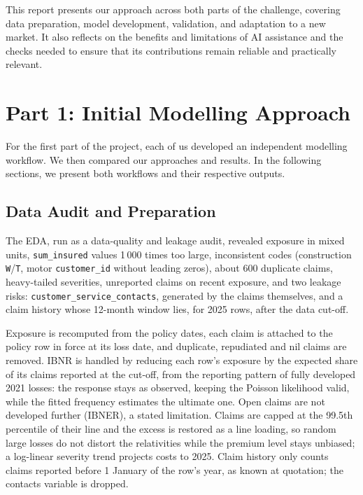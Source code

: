 \documentclass{rapport}
\begin{document}
This report presents our approach across both parts of the challenge, covering data preparation, model development, validation, and adaptation to a new market. It also reflects on the benefits and limitations of AI assistance and the checks needed to ensure that its contributions remain reliable and practically relevant.

\section{Part 1: Initial Modelling Approach}

For the first part of the project, each of us developed an independent modelling workflow. We then compared our approaches and results. In the following sections, we present both workflows and their respective outputs.

\subsection{Data Audit and Preparation}

The EDA, run as a data-quality and leakage audit, revealed exposure in mixed units, \texttt{sum\_insured} values 1\,000 times too large, inconsistent codes (construction \texttt{W}/\texttt{T}, motor \texttt{customer\_id} without leading zeros), about 600 duplicate claims, heavy-tailed severities, unreported claims on recent exposure, and two leakage risks: \texttt{customer\_service\_contacts}, generated by the claims themselves, and a claim history whose 12-month window lies, for 2025 rows, after the data cut-off.

Exposure is recomputed from the policy dates, each claim is attached to the policy row in force at its loss date, and duplicate, repudiated and nil claims are removed. IBNR is handled by reducing each row's exposure by the expected share of its claims reported at the cut-off, from the reporting pattern of fully developed 2021 losses: the response stays as observed, keeping the Poisson likelihood valid, while the fitted frequency estimates the ultimate one. Open claims are not developed further (IBNER), a stated limitation. Claims are capped at the 99.5th percentile of their line and the excess is restored as a line loading, so random large losses do not distort the relativities while the premium level stays unbiased; a log-linear severity trend projects costs to 2025. Claim history only counts claims reported before 1 January of the row's year, as known at quotation; the contacts variable is dropped.
\end{document}
